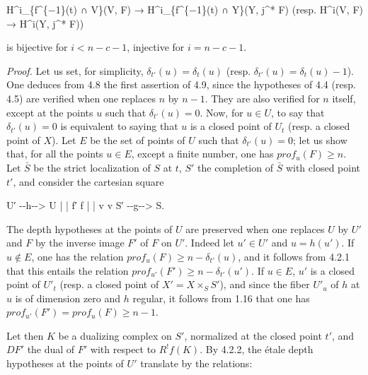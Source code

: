 \documentclass[
]{article}
\newenvironment{Shaded}{}{}
\newcommand{\NormalTok}[1]{#1}
\begin{document}
\begin{Shaded}
\begin{Highlighting}[]
\NormalTok{H\^{}i\_\{f\^{}\{−1\}(t) ∩ V\}(V, F) → H\^{}i\_\{f\^{}\{−1\}(t) ∩ Y\}(Y, j\^{}* F)   (resp. H\^{}i(V, F) → H\^{}i(Y, j\^{}* F))}
\end{Highlighting}
\end{Shaded}

is bijective for \(i < n - c - 1\), injective for \(i = n - c - 1\).

\emph{Proof.} Let us set, for simplicity,
\(\delta_{t'}(u) = \delta_{t}(u)\) (resp.
\(\delta_{t'}(u) = \delta_{t}(u) - 1\)). One deduces from 4.8 the first
assertion of 4.9, since the hypotheses of 4.4 (resp. 4.5) are verified
when one replaces \(n\) by \(n - 1\). They are also verified for \(n\)
itself, except at the points \(u\) such that \(\delta_{t'}(u) = 0\).
Now, for \(u \in U\), to say that \(\delta_{t'}(u) = 0\) is equivalent
to saying that \(u\) is a closed point of \(U_{t}\) (resp. a closed
point of \(X\)). Let \(E\) be the set of points of \(U\) such that
\(\delta_{t'}(u) = 0\); let us show that, for all the points
\(u \in E\), except a finite number, one has
\(prof_{u}(F) \geqslant n\). Let \(\bar{S}\) be the strict localization
of \(S\) at \(t\), \(S'\) the completion of \(\bar{S}\) with closed
point \(t'\), and consider the cartesian square

\begin{Shaded}
\begin{Highlighting}[]
\NormalTok{U′ {-}{-}h{-}{-}\textgreater{} U}
\NormalTok{|         |}
\NormalTok{f′        f}
\NormalTok{|         |}
\NormalTok{v         v}
\NormalTok{S′ {-}{-}g{-}{-}\textgreater{} S.}
\end{Highlighting}
\end{Shaded}

The depth hypotheses at the points of \(U\) are preserved when one
replaces \(U\) by \(U'\) and \(F\) by the inverse image \(F'\) of \(F\)
on \(U'\). Indeed let \(u' \in U'\) and \(u = h(u')\). If
\(u \notin E\), one has the relation
\(prof_{u}(F) \geqslant n - \delta_{t'}(u)\), and it follows from 4.2.1
that this entails the relation
\(prof_{u'}(F') \geqslant n - \delta_{t'}(u')\). If \(u \in E\), \(u'\)
is a closed point of \(U'_{t}\) (resp. a closed point of
\(X' = X \times_{S} S'\)), and since the fiber \(U'_{u}\) of \(h\) at
\(u\) is of dimension zero and \(h\) regular, it follows from 1.16 that
one has \(prof_{u'}(F') = prof_{u}(F) \geqslant n - 1\).

Let then \(K\) be a dualizing complex on \(S'\), normalized at the
closed point \(t'\), and \(DF'\) the dual of \(F'\) with respect to
\(R^{!} f(K)\). By 4.2.2, the étale depth hypotheses at the points of
\(U'\) translate by the relations:
\end{document}
